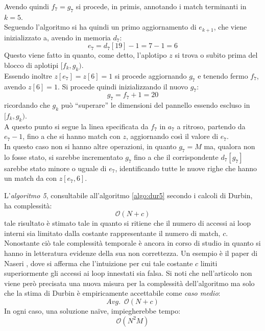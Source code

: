 \begin{esempio}
  Avendo quindi $f_7=g_7$ si procede, in primis, annotando i match terminanti in
  $k=5$.\\
  Seguendo l'algoritmo si ha quindi un primo aggiornamento di $e_{k+1}$, che
  viene inizializzato a, avendo in memoria $d_7$: 
  \[e_7=d_7[19]-1=7-1=6\]
  Questo viene fatto in quanto, come detto, l'aplotipo $z$ si trova o subito
  prima del blocco di aplotipi $[f_k,g_k)$.\\
  Essendo inoltre $z[e_7]=z[6]=1$ si procede aggiornando $g_7$ e tenendo fermo
  $f_7$, avendo $z[6]=1$. Si procede quindi inizializzando il
  nuovo $g_7$:
  \[g_7=f_7+1=20\]
  ricordando che $g_k$ può ``superare'' le dimensioni del pannello essendo
  escluso in $[f_k,g_k)$.\\
  A questo punto si segue la linea specificata da $f_7$ in $a_7$ a ritroso,
  partendo da $e_7-1$, fino a che si hanno match con $z$, aggiornando così il
  valore di $e_7$.\\
  In questo caso non si hanno altre operazioni, in quanto $g_7=M$ ma, qualora
  non lo fosse stato, si sarebbe incrementato $g_7$ fino a che il corrispondente
  $d_7[g_7]$ sarebbe stato minore o uguale di $e_7$, identificando tutte le
  nuove righe che hanno un match da con $z[e_7, 6]$.
\end{esempio}
L'\textit{algoritmo 5}, consultabile all'algoritmo \ref{algo:dur5} secondo i
calcoli di Durbin, ha complessità:
\begin{equation}
  \label{eq:pbwtsmem5}
  \mathcal{O}(N+c)
\end{equation}
tale risultato è stimato tale in quanto si ritiene che il
numero di accessi ai loop interni sia limitato dalla costante rappresentante il
numero di match, $c$. Nonostante ciò tale complessità temporale è ancora in
corso di studio in quanto si hanno in letteratura evidenze della sua non
correttezza. Un esempio è il paper di Naseri \cite{dpbwt}, dove si afferma che
l'intuizione per cui tale costante $c$ limiti superiormente gli accessi ai loop
innestati sia falsa. Si noti che nell'articolo non viene però precisata una
nuova misura per la complessità dell'algoritmo ma solo che la stima di Durbin è
empiricamente accettabile come \textit{caso medio}:
\begin{equation}
  \label{eq:pbwtsmem6}
  Avg.\,\,\,\mathcal{O}(N+c)
\end{equation}
In ogni caso, una soluzione na\"{i}ve, impiegherebbe tempo:
\begin{equation}
  \label{eq:pbwtsmem7}
  \mathcal{O}(N^2M)
\end{equation}
